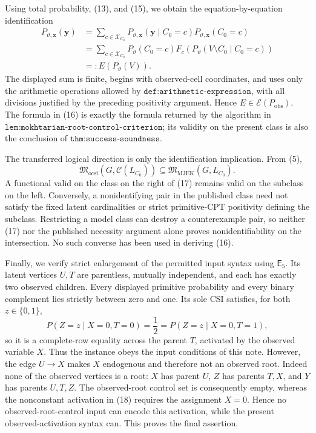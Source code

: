 Using total probability, (13), and (15), we obtain the equation-by-equation identification
\[
\begin{aligned}
P_{\vartheta,\mathbf x}(\mathbf y)
&=\sum_{c\in\mathcal X_{C_0}}
  P_{\vartheta,\mathbf x}(\mathbf y\mid C_0=c)
  P_{\vartheta,\mathbf x}(C_0=c)\\
&=\sum_{c\in\mathcal X_{C_0}}
  P_\vartheta(C_0=c)
  F_c\!\left(P_\vartheta(V\setminus C_0\mid C_0=c)\right)\\
&=:E(P_\vartheta(V)).
\end{aligned}
\tag{16}
\]
The displayed sum is finite, begins with observed-cell coordinates, and uses only the arithmetic operations allowed by \(\texttt{def:arithmetic-expression}\), with all divisions justified by the preceding positivity argument.  Hence \(E\in\mathscr E(P_{\mathrm{obs}})\).  The formula in (16) is exactly the formula returned by the algorithm in \(\texttt{lem:mokhtarian-root-control-criterion}\); its validity on the present class is also the conclusion of \(\texttt{thm:success-soundness}\).

The transferred logical direction is only the identification implication.  From (5),
\[
\mathfrak M_{\mathrm{ocsi}}\!\left(G,\mathcal C(L_{C_0})\right)
\subseteq\mathfrak M_{\mathrm{MJEK}}(G,L_{C_0}).
\tag{17}
\]
A functional valid on the class on the right of (17) remains valid on the subclass on the left.  Conversely, a nonidentifying pair in the published class need not satisfy the fixed latent cardinalities or strict primitive-CPT positivity defining the subclass.  Restricting a model class can destroy a counterexample pair, so neither (17) nor the published necessity argument alone proves nonidentifiability on the intersection.  No such converse has been used in deriving (16).

Finally, we verify strict enlargement of the permitted input syntax using \(\mathsf E_5\).  Its latent vertices \(U,T\) are parentless, mutually independent, and each has exactly two observed children.  Every displayed primitive probability and every binary complement lies strictly between zero and one.  Its sole CSI satisfies, for both \(z\in\{0,1\}\),
\[
P(Z=z\mid X=0,T=0)=\frac12
=P(Z=z\mid X=0,T=1),
\tag{18}
\]
so it is a complete-row equality across the parent \(T\), activated by the observed variable \(X\).  Thus the instance obeys the input conditions of this note.  However, the edge \(U\to X\) makes \(X\) endogenous and therefore not an observed root.  Indeed none of the observed vertices is a root: \(X\) has parent \(U\), \(Z\) has parents \(T,X\), and \(Y\) has parents \(U,T,Z\).  The observed-root control set is consequently empty, whereas the nonconstant activation in (18) requires the assignment \(X=0\).  Hence no observed-root-control input can encode this activation, while the present observed-activation syntax can.  This proves the final assertion.
